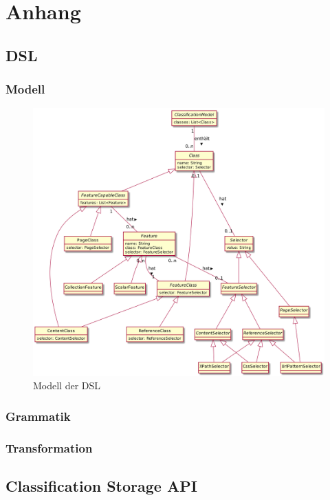 \chapter{Anhang}

\section{DSL}
    \label{appendix:dsl}
    \subsection{Modell}
        \begin{figure}[htb]
            \centering
            \includegraphics[scale=\imageScalingFactor]{../resources/dsl/model.png}
            \caption{Modell der DSL}
            \label{image:dslCompleteModel}
        \end{figure}
    
    \subsection{Grammatik}
        

    \subsection{Transformation}
        

\section{Classification Storage API}
    